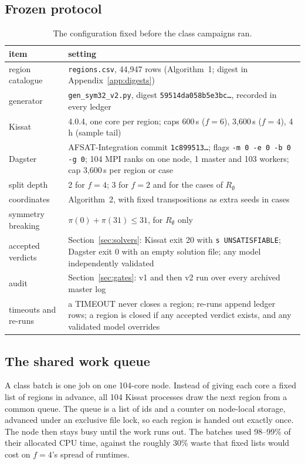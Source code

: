\documentclass[11pt,a4paper]{article}
\theoremstyle{definition}
\newcommand{\code}[1]{\texttt{#1}}
\newcommand{\st}[1]{\textsf{#1}}
\begin{document}
\subsection{Frozen protocol}\label{sec:protocol}
\begin{table}[H]
\centering\small
\begin{tabular}{@{}l p{10.6cm}@{}}
\toprule
item & setting \\
\midrule
region catalogue & \code{regions.csv}, 44{,}947 rows (Algorithm~1; digest in Appendix~\ref{app:digests}) \\
generator & \code{gen\_sym32\_v2.py}, digest \code{59514da058b5e3bc\ldots}, recorded in every ledger \\
Kissat & 4.0.4, one core per region; caps 600\,s ($f=6$), 3{,}600\,s ($f=4$), 4\,h (sample tail) \\
Dagster & AFSAT-Integration commit \code{1c899513\ldots}; flags \code{-m 0 -e 0 -b 0 -g 0}; 104 MPI ranks on one node, 1 master and 103 workers; cap 3{,}600\,s per region or case \\
split depth & 2 for $f=4$; 3 for $f=2$ and for the cases of $R_\emptyset$ \\
coordinates & Algorithm~2, with fixed transpositions as extra seeds in cases \\
symmetry breaking & $\pi(0)+\pi(31)\le31$, for $R_\emptyset$ only \\
accepted verdicts & Section~\ref{sec:solvers}: Kissat exit 20 with \code{s UNSATISFIABLE}; Dagster exit 0 with an empty solution file; any model independently validated \\
audit & Section~\ref{sec:gates}: v1 and then v2 run over every archived master log \\
timeouts and re-runs & a \st{TIMEOUT} never closes a region; re-runs append ledger rows; a region is closed if any accepted verdict exists, and any validated model overrides \\
\bottomrule
\end{tabular}
\caption{The configuration fixed before the class campaigns ran.}
\label{tab:protocol}
\end{table}

\subsection{The shared work queue}\label{sec:queue}
A class batch is one job on one 104-core node. Instead of giving each core a fixed list of
regions in advance, all 104 Kissat processes draw the next region from a common queue. The
queue is a list of ids and a counter on node-local storage, advanced under an exclusive file
lock, so each region is handed out exactly once. The node then stays busy until the work
runs out. The batches used 98--99\% of their allocated CPU time, against the roughly 30\%
waste that fixed lists would cost on $f=4$'s spread of runtimes.
\end{document}
